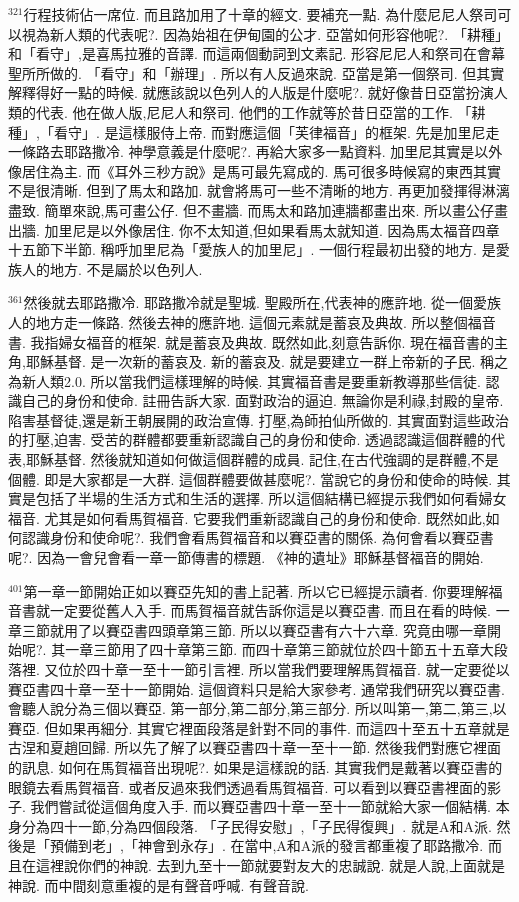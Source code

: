 \documentclass{book}
\begin{document}
$^{321}$行程技術佔一席位.
而且路加用了十章的經文.
要補充一點.
為什麼尼尼人祭司可以視為新人類的代表呢?.
因為始祖在伊甸園的公才.
亞當如何形容他呢?.
「耕種」和「看守」,是喜馬拉雅的音譯.
而這兩個動詞到文素記.
形容尼尼人和祭司在會幕聖所所做的.
「看守」和「辦理」.
所以有人反過來說.
亞當是第一個祭司.
但其實解釋得好一點的時候.
就應該說以色列人的人版是什麼呢?.
就好像昔日亞當扮演人類的代表.
他在做人版,尼尼人和祭司.
他們的工作就等於昔日亞當的工作.
「耕種」,「看守」.
是這樣服侍上帝.
而對應這個「芙律福音」的框架.
先是加里尼走一條路去耶路撒冷.
神學意義是什麼呢?.
再給大家多一點資料.
加里尼其實是以外像居住為主.
而《耳外三秒方說》是馬可最先寫成的.
馬可很多時候寫的東西其實不是很清晰.
但到了馬太和路加.
就會將馬可一些不清晰的地方.
再更加發揮得淋漓盡致.
簡單來說,馬可畫公仔.
但不畫牆.
而馬太和路加連牆都畫出來.
所以畫公仔畫出牆.
加里尼是以外像居住.
你不太知道,但如果看馬太就知道.
因為馬太福音四章十五節下半節.
稱呼加里尼為「愛族人的加里尼」.
一個行程最初出發的地方.
是愛族人的地方.
不是屬於以色列人.

$^{361}$然後就去耶路撒冷.
耶路撒冷就是聖城.
聖殿所在,代表神的應許地.
從一個愛族人的地方走一條路.
然後去神的應許地.
這個元素就是蓄哀及典故.
所以整個福音書.
我指婦女福音的框架.
就是蓄哀及典故.
既然如此,刻意告訴你.
現在福音書的主角,耶穌基督.
是一次新的蓄哀及.
新的蓄哀及.
就是要建立一群上帝新的子民.
稱之為新人類2.0.
所以當我們這樣理解的時候.
其實福音書是要重新教導那些信徒.
認識自己的身份和使命.
註冊告訴大家.
面對政治的逼迫.
無論你是利祿,封殿的皇帝.
陷害基督徒,還是新王朝展開的政治宣傳.
打壓,為師拍仙所做的.
其實面對這些政治的打壓,迫害.
受苦的群體都要重新認識自己的身份和使命.
透過認識這個群體的代表,耶穌基督.
然後就知道如何做這個群體的成員.
記住,在古代強調的是群體,不是個體.
即是大家都是一大群.
這個群體要做甚麼呢?.
當說它的身份和使命的時候.
其實是包括了半場的生活方式和生活的選擇.
所以這個結構已經提示我們如何看婦女福音.
尤其是如何看馬賀福音.
它要我們重新認識自己的身份和使命.
既然如此,如何認識身份和使命呢?.
我們會看馬賀福音和以賽亞書的關係.
為何會看以賽亞書呢?.
因為一會兒會看一章一節傳書的標題.
《神的遺址》耶穌基督福音的開始.

$^{401}$第一章一節開始正如以賽亞先知的書上記著.
所以它已經提示讀者.
你要理解福音書就一定要從舊人入手.
而馬賀福音就告訴你這是以賽亞書.
而且在看的時候.
一章三節就用了以賽亞書四頭章第三節.
所以以賽亞書有六十六章.
究竟由哪一章開始呢?.
其一章三節用了四十章第三節.
而四十章第三節就位於四十節五十五章大段落裡.
又位於四十章一至十一節引言裡.
所以當我們要理解馬賀福音.
就一定要從以賽亞書四十章一至十一節開始.
這個資料只是給大家參考.
通常我們研究以賽亞書.
會聽人說分為三個以賽亞.
第一部分,第二部分,第三部分.
所以叫第一,第二,第三,以賽亞.
但如果再細分.
其實它裡面段落是針對不同的事件.
而這四十至五十五章就是古涅和夏趙回歸.
所以先了解了以賽亞書四十章一至十一節.
然後我們對應它裡面的訊息.
如何在馬賀福音出現呢?.
如果是這樣說的話.
其實我們是戴著以賽亞書的眼鏡去看馬賀福音.
或者反過來我們透過看馬賀福音.
可以看到以賽亞書裡面的影子.
我們嘗試從這個角度入手.
而以賽亞書四十章一至十一節就給大家一個結構.
本身分為四十一節,分為四個段落.
「子民得安慰」,「子民得復興」.
就是A和A派.
然後是「預備到老」,「神會到永存」.
在當中,A和A派的發言都重複了耶路撒冷.
而且在這裡說你們的神說.
去到九至十一節就要對友大的忠誠說.
就是人說,上面就是神說.
而中間刻意重複的是有聲音呼喊.
有聲音說.
\end{document}
